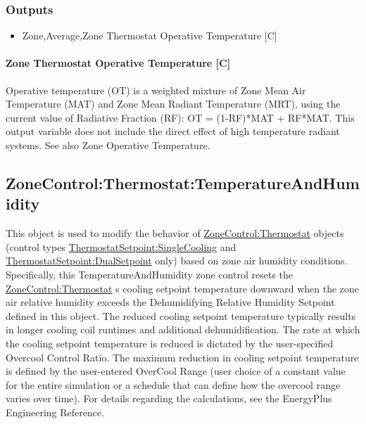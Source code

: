 \subsubsection{Outputs}\label{outputs-1-032}

\begin{itemize}
\tightlist
\item
  Zone,Average,Zone Thermostat Operative Temperature {[}C{]}
\end{itemize}

\paragraph{Zone Thermostat Operative Temperature {[}C{]}}\label{zone-thermostat-operative-temperature-c}

Operative temperature (OT) is a weighted mixture of Zone Mean Air Temperature (MAT) and Zone Mean Radiant Temperature (MRT), using the current value of Radiative Fraction (RF): OT = (1-RF)*MAT + RF*MAT. This output variable does not include the direct effect of high temperature radiant systems. See also Zone Operative Temperature.

\subsection{ZoneControl:Thermostat:TemperatureAndHumidity}\label{zonecontrolthermostattemperatureandhumidity}

This object is used to modify the behavior of \hyperref[zonecontrolthermostat]{ZoneControl:Thermostat} objects (control types \hyperref[thermostatsetpointsinglecooling]{ThermostatSetpoint:SingleCooling} and \hyperref[thermostatsetpointdualsetpoint]{ThermostatSetpoint:DualSetpoint} only) based on zone air humidity conditions. Specifically, this TemperatureAndHumidity zone control resets the \hyperref[zonecontrolthermostat]{ZoneControl:Thermostat} s cooling setpoint temperature downward when the zone air relative humidity exceeds the Dehumidifying Relative Humidity Setpoint defined in this object. The reduced cooling setpoint temperature typically results in longer cooling coil runtimes and additional dehumidification. The rate at which the cooling setpoint temperature is reduced is dictated by the user-specified Overcool Control Ratio. The maximum reduction in cooling setpoint temperature is defined by the user-entered OverCool Range (user choice of a constant value for the entire simulation or a schedule that can define how the overcool range varies over time). For details regarding the calculations, see the EnergyPlus Engineering Reference.

